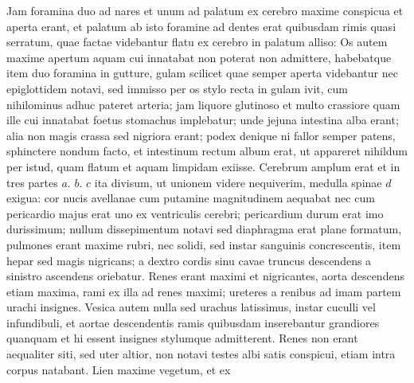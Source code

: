\pstart%
Jam foramina duo ad nares et unum ad palatum ex cerebro maxime conspicua et aperta erant, et palatum ab isto foramine ad dentes erat quibusdam rimis quasi serratum, quae factae videbantur flatu ex cerebro in palatum alliso:
Os autem maxime apertum aquam cui innatabat non poterat non admittere, habebatque item duo foramina in gutture, gulam scilicet
quae semper aperta videbantur nec epiglottidem notavi, sed immisso per os stylo recta in gulam ivit, cum nihilominus adhuc pateret arteria; jam liquore glutinoso et multo crassiore quam ille cui innatabat foetus stomachus implebatur; unde jejuna intestina alba erant; alia non magis crassa sed nigriora erant; podex denique ni fallor semper patens, sphinctere nondum facto, et intestinum rectum album erat, ut appareret nihildum per istud, quam flatum et aquam limpidam exiisse.
\pend%
\pstart%
Cerebrum amplum erat et in tres partes $a.$ $b.$ $c$ ita divisum, ut
unionem videre nequiverim, medulla spinae $d$ exigua:
cor nucis avellanae cum putamine magnitudinem aequabat nec cum pericardio majus erat uno ex ventriculis cerebri; pericardium durum erat imo durissimum; nullum dissepimentum notavi sed diaphragma erat plane
formatum, pulmones erant maxime rubri, nec solidi, sed instar sanguinis concrescentis, item hepar sed magis nigricans; a dextro cordis sinu cavae truncus descendens a sinistro ascendens oriebatur. Renes erant maximi et nigricantes, aorta descendens etiam maxima, rami ex illa ad renes maximi; ureteres a renibus ad imam partem urachi insignes. Vesica autem nulla sed urachus latissimus, instar cuculli vel infundibuli,
 et aortae descendentis ramis quibusdam inserebantur grandiores quanquam et hi essent insignes stylumque admitterent.
Renes non erant aequaliter siti, sed uter altior, non notavi testes albi satis conspicui, etiam intra corpus natabant. Lien maxime vegetum, et ex

